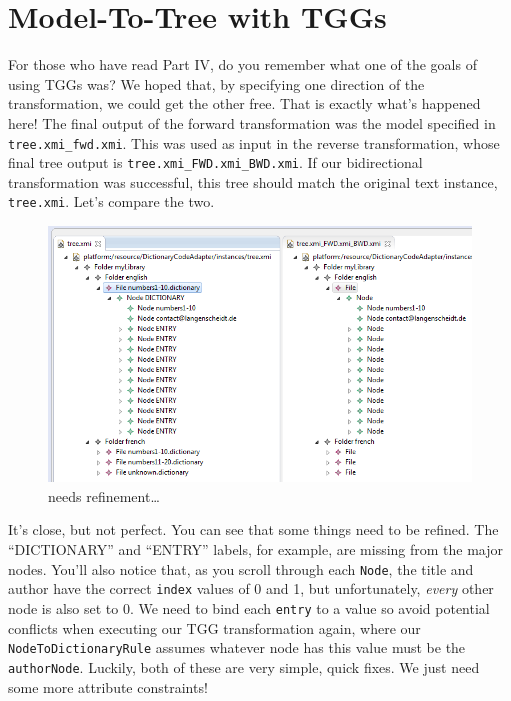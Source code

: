 \newpage
\section{Model-To-Tree with TGGs}
\genHeader

For those who have read Part IV, do you remember what one of the goals of using TGGs was? We hoped that, by specifying one direction of the transformation, we
could get the other free. That is exactly what's happened here! The final output of the forward transformation was the model specified in
\texttt{tree.xmi\_fwd.xmi}. This was used as input in the reverse transformation, whose final tree output is \texttt{tree.xmi\_FWD.xmi\_BWD.xmi}. If our
bidirectional transformation was successful, this tree should match the original text instance, \texttt{tree.xmi}. Let's compare the two.

\vspace{0.5cm}

\begin{figure}[htpb]
\begin{center}
  \includegraphics[width=\textwidth]{eclipse_generatedBackwardsModel}
  \caption{needs refinement\ldots}
  \label{eclipse:generatedBkwrdMdl}
\end{center}
\end{figure}

\vspace{0.5cm}

It's close, but not perfect. You can see that some things need to be refined. The ``DICTIONARY'' and ``ENTRY'' labels, for example, are missing from the
major nodes. You'll also notice that, as you scroll through each \texttt{Node}, the title and author have the correct \texttt{index} values of 0 and 1, but
unfortunately, \emph{every} other node is also set to 0. We need to bind each \texttt{entry} to a value so avoid potential conflicts when executing our TGG
transformation again, where our \texttt{NodeToDictionaryRule} assumes whatever node has this value must be the \texttt{authorNode}. Luckily, both of these are
very simple, quick fixes. We just need some more attribute constraints!







